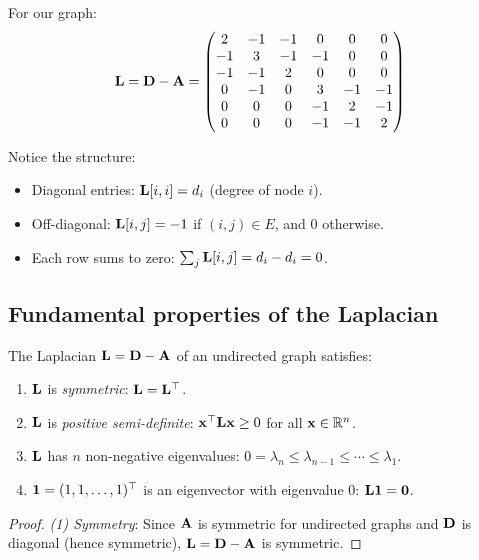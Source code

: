 \begin{notechapter}
\begin{example}
For our graph:
\[
\mathbf{L} = \mathbf{D} - \mathbf{A} = \begin{pmatrix}
2 & -1 & -1 & 0 & 0 & 0 \\
-1 & 3 & -1 & -1 & 0 & 0 \\
-1 & -1 & 2 & 0 & 0 & 0 \\
0 & -1 & 0 & 3 & -1 & -1 \\
0 & 0 & 0 & -1 & 2 & -1 \\
0 & 0 & 0 & -1 & -1 & 2
\end{pmatrix}
\]

Notice the structure:
\begin{itemize}
    \item Diagonal entries: $\mathbf{L}[i,i] = d_i$ (degree of node $i$).
    \item Off-diagonal: $\mathbf{L}[i,j] = -1$ if $(i,j) \in E$, and $0$ otherwise.
    \item Each row sums to zero: $\sum_j \mathbf{L}[i,j] = d_i - d_i = 0$.
\end{itemize}
\end{example}

\subsection{Fundamental properties of the Laplacian}

\begin{theorem}\label{graph-laplacians:thm:laplacian-properties}
The Laplacian $\mathbf{L} = \mathbf{D} - \mathbf{A}$ of an undirected graph satisfies:
\begin{enumerate}
    \item $\mathbf{L}$ is \emph{symmetric}: $\mathbf{L} = \mathbf{L}^\top$.
    \item $\mathbf{L}$ is \emph{positive semi-definite}: $\mathbf{x}^\top \mathbf{L} \mathbf{x} \geq 0$ for all $\mathbf{x} \in \mathbb{R}^n$.
    \item $\mathbf{L}$ has $n$ non-negative eigenvalues: $0 = \lambda_n \leq \lambda_{n-1} \leq \cdots \leq \lambda_1$.
    \item $\mathbf{1} = (1, 1, \ldots, 1)^\top$ is an eigenvector with eigenvalue $0$: $\mathbf{L} \mathbf{1} = \mathbf{0}$.
\end{enumerate}
\end{theorem}

\begin{proof}
\emph{(1) Symmetry}: Since $\mathbf{A}$ is symmetric for undirected graphs and $\mathbf{D}$ is diagonal (hence symmetric), $\mathbf{L} = \mathbf{D} - \mathbf{A}$ is symmetric.


\end{proof}
\end{notechapter}
